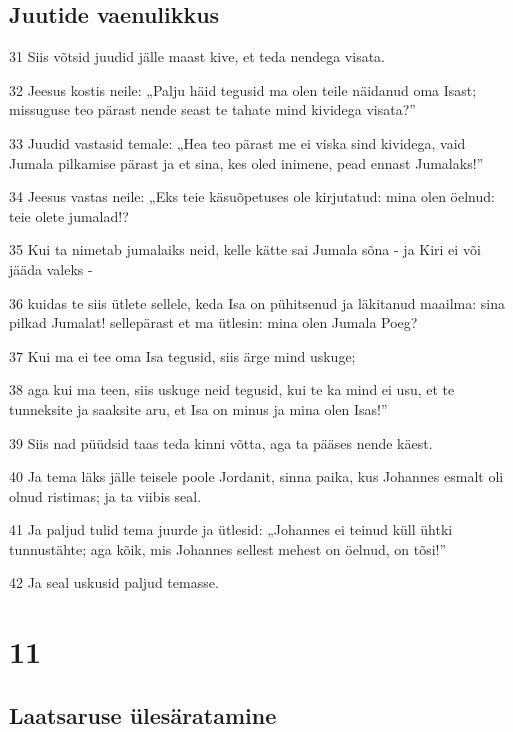 \section*{Juutide vaenulikkus}

\par 31 Siis võtsid juudid jälle maast kive, et teda nendega visata.
\par 32 Jeesus kostis neile: „Palju häid tegusid ma olen teile näidanud oma Isast; missuguse teo pärast nende seast te tahate mind kividega visata?”
\par 33 Juudid vastasid temale: „Hea teo pärast me ei viska sind kividega, vaid Jumala pilkamise pärast ja et sina, kes oled inimene, pead ennast Jumalaks!”
\par 34 Jeesus vastas neile: „Eks teie käsuõpetuses ole kirjutatud: mina olen öelnud: teie olete jumalad!?
\par 35 Kui ta nimetab jumalaiks neid, kelle kätte sai Jumala sõna - ja Kiri ei või jääda valeks -
\par 36 kuidas te siis ütlete sellele, keda Isa on pühitsenud ja läkitanud maailma: sina pilkad Jumalat! sellepärast et ma ütlesin: mina olen Jumala Poeg?
\par 37 Kui ma ei tee oma Isa tegusid, siis ärge mind uskuge;
\par 38 aga kui ma teen, siis uskuge neid tegusid, kui te ka mind ei usu, et te tunneksite ja saaksite aru, et Isa on minus ja mina olen Isas!”
\par 39 Siis nad püüdsid taas teda kinni võtta, aga ta pääses nende käest.
\par 40 Ja tema läks jälle teisele poole Jordanit, sinna paika, kus Johannes esmalt oli olnud ristimas; ja ta viibis seal.
\par 41 Ja paljud tulid tema juurde ja ütlesid: „Johannes ei teinud küll ühtki tunnustähte; aga kõik, mis Johannes sellest mehest on öelnud, on tõsi!”
\par 42 Ja seal uskusid paljud temasse.


\chapter{11}

\section*{Laatsaruse ülesäratamine}

